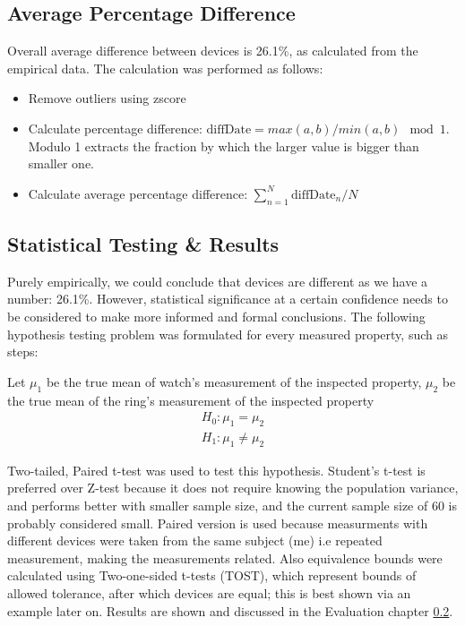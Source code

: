 \subsection{Average Percentage Difference}
Overall average difference between devices is 26.1\%, as calculated from the empirical data. The calculation was performed as follows: 
\begin{itemize}
    \item Remove outliers using zscore
    \item Calculate percentage difference: $\text{diffDate} = max(a,b) / min(a,b) \mod 1$. Modulo 1 extracts the fraction by which the larger value is bigger than smaller one.
    \item Calculate average percentage difference: $\sum_{n=1}^{N} \text{diffDate}_n / N$
\end{itemize}
\subsection{Statistical Testing \& Results}
Purely empirically, we could conclude that devices are different as we have a number: 26.1\%. However, statistical significance at a certain confidence needs to be considered to make more informed and formal conclusions. The following hypothesis testing problem was formulated for every measured property, such as steps: 

Let $\mu_1$ be the true mean of watch's measurement of the inspected property, $\mu_2$ be the true mean of the ring's measurement of the inspected property
\begin{align*}
    H_0:\mu_1 = \mu_2 \\
    H_1: \mu_1 \neq \mu_2
\end{align*}


Two-tailed, Paired t-test was used to test this hypothesis. Student's t-test is preferred over Z-test because it does not require knowing the population variance, and performs better with smaller sample size, and the current sample size of 60 is probably considered small. Paired version is used because measurments with different devices were taken from the same subject (me) i.e repeated measurement, making the measurements related. Also equivalence bounds were calculated using Two-one-sided t-tests (TOST), which represent bounds of allowed tolerance, after which devices are equal; this is best shown via an example later on. Results are shown and discussed in the Evaluation chapter \ref{}.

